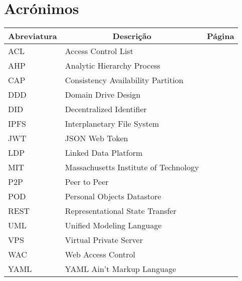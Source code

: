 

\chapter[Glossary]{Acrónimos}

\begin{center}
\small
\begin{longtable}{lp{3.0in}c}
\toprule \multicolumn{1}{c}{Abreviatura}
                & \multicolumn{1}{c}{Descrição}
                                & \multicolumn{1}{c}{Página}\\ \midrule\addlinespace[2pt] \endhead

\bottomrule\endfoot

ACL & Access Control List & \pageref{sym:ACL} \\
AHP & Analytic Hierarchy Process & \pageref{sym:AHP} \\
CAP & Consistency Availability Partition & \pageref{sym:cap} \\
DDD & Domain Drive Design & \pageref{sym:DDD} \\
DID & Decentralized Identifier & \pageref{sym:DID} \\
IPFS & Interplanetary File System & \pageref{sym:IPFS} \\
JWT & JSON Web Token & \pageref{sym:jwt} \\
LDP & Linked Data Platform & \pageref{sym:LDP} \\
MIT & Massachusetts Institute of Technology & \pageref{sym:MIT} \\
P2P & Peer to Peer & \pageref{sym:P2P} \\
POD & Personal Objects Datastore & \pageref{sym:POD} \\
REST & Representational State Transfer & \pageref{sym:REST} \\
UML & Unified Modeling Language & \pageref{sym:UML} \\
VPS & Virtual Private Server & \pageref{sym:vps} \\
WAC & Web Access Control & \pageref{sym:WAC} \\
YAML & YAML Ain't Markup Language & \pageref{sym:YAML}

\end{longtable}

\end{center}



